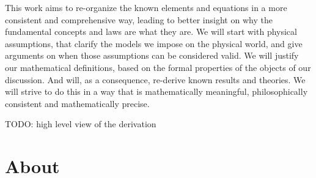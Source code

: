 \documentclass[aps,pra,10pt,twocolumn,floatfix,nofootinbib]{revtex4-1}
\theoremstyle{definition}
\begin{document}
This work aims to re-organize the known elements and equations in a more consistent and comprehensive way, leading to better insight on why the fundamental concepts and laws are what they are. We will start with physical assumptions, that clarify the models we impose on the physical world, and give arguments on when those assumptions can be considered valid. We will justify our mathematical definitions, based on the formal properties of the objects of our discussion. And will, as a consequence, re-derive known results and theories. We will strive to do this in a way that is mathematically meaningful, philosophically consistent and mathematically precise.

TODO: high level view of the derivation



\section{About}
\end{document}
